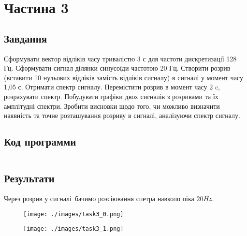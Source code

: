 \section{Частина 3}
\label{sec:task3}

\subsection{Завдання}
\label{subsec:task3_task}

Сформувати вектор відліків часу тривалістю 3 с для частоти
дискретизації 128 Гц. Сформувати сигнал ділянки синусоїди частотою 20 Гц.
Створити розрив (вставити 10 нульових відліків замість відліків сигналу) в
сигналі у момент часу 1,05 с. Отримати спектр сигналу. Перемістити розрив в
момент часу 2 c, розрахувати спектр. Побудувати графіки двох сигналів з
розривами та їх амплітудні спектри. Зробити висновки щодо
того, чи можливо визначити наявність та точне розташування розриву в
сигналі, аналізуючи спектр сигналу.

\subsection{Код программи}
\label{subsec:task3_code}
\inputminted{python}{../src/task3.py}

\subsection{Результати}
\label{subsec:task3_results}

Через розрив у сигналі бачимо розсіювання спетра навколо піка $20 Hz$.

\begin{figure}[!ht]
    \centering
    \texttt{[image: ./images/task3\_0.png]}
\end{figure}

\begin{figure}[!ht]
    \centering
    \texttt{[image: ./images/task3\_1.png]}
\end{figure}
